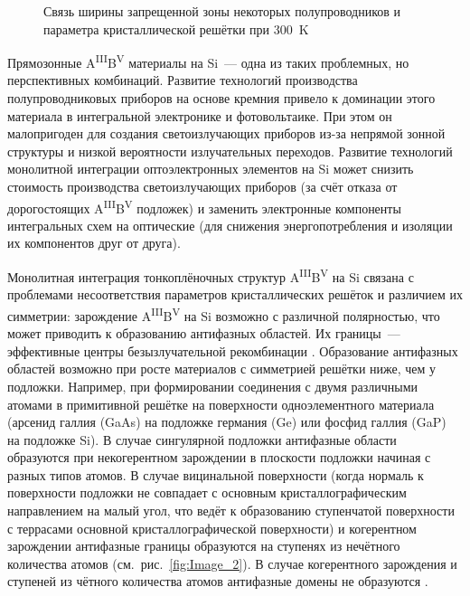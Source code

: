 \begin{figure}[ht]  \caption{Связь ширины запрещенной зоны некоторых полупроводников и
параметра кристаллической решётки при 300~\si{\kelvin}}\label{fig:Image_1}
	\end{figure}

Прямозонные A\textsuperscript{III}B\textsuperscript{V} материалы на Si~--- одна
из таких проблемных, но перспективных комбинаций. Развитие технологий
производства полупроводниковых приборов на основе кремния привело к  доминации
этого материала в интегральной электронике и фотовольтаике. При этом он
малопригоден для создания светоизлучающих приборов из-за непрямой зонной
структуры и низкой вероятности излучательных переходов. Развитие технологий
монолитной интеграции оптоэлектронных элементов на Si может снизить стоимость
производства светоизлучающих приборов (за счёт отказа от дорогостоящих
A\textsuperscript{III}B\textsuperscript{V} подложек) и заменить электронные
компоненты интегральных схем на оптические (для снижения энергопотребления и
изоляции их компонентов друг от друга).

Монолитная интеграция тонкоплёночных структур
A\textsuperscript{III}B\textsuperscript{V} на Si связана с проблемами
несоответствия параметров кристаллических решёток и различием их симметрии:
зарождение A\textsuperscript{III}B\textsuperscript{V} на Si возможно с
различной полярностью, что может приводить к образованию антифазных областей.
Их границы~--- эффективные центры безызлучательной рекомбинации
\cite{Takagi1998}. Образование антифазных областей возможно при росте
материалов с симметрией решётки ниже, чем у подложки. Например, при
формировании соединения с двумя различными атомами в примитивной решётке на
поверхности одноэлементного материала (арсенид галлия (GaAs) на подложке
германия (Ge) или фосфид галлия (GaP) на подложке Si). В случае сингулярной
подложки антифазные области образуются при некогерентном зарождении в плоскости
подложки начиная с разных типов атомов. В случае вицинальной поверхности (когда
нормаль к поверхности подложки не совпадает с основным кристаллографическим
направлением на малый угол, что ведёт к образованию ступенчатой поверхности с
террасами основной кристаллографической поверхности) и когерентном зарождении
антифазные границы образуются на ступенях из нечётного количества атомов
(см.~рис.~\cref{fig:Image_2}). В случае когерентного зарождения и ступеней из
чётного количества атомов антифазные домены не образуются \cite{Faucher2016}.

